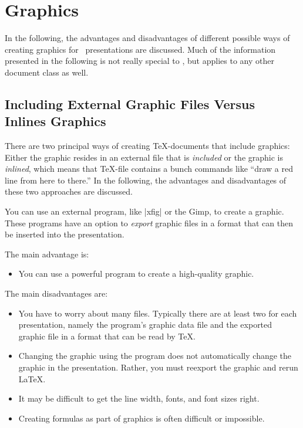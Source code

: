 

%

\section{Graphics}


\label{section-graphics}

In the following, the advantages and disadvantages of different
possible ways of creating graphics for \beamer\ presentations are
discussed. Much of the information presented in the following is not
really special to \beamer, but applies to any other document class as well.


\subsection{Including External Graphic Files Versus Inlines Graphics}

There are two principal ways of creating \TeX-documents that include
graphics: Either the graphic resides in an external file that is
\emph{included} or the graphic is \emph{inlined}, which means that
\TeX-file contains a bunch commands like ``draw a red line from
here to there.'' In the following, the advantages and disadvantages of
these two approaches are discussed.

You can use an external program, like |xfig| or the Gimp, to create a
graphic. These programs have an option to \emph{export} graphic files
in a format that can then be inserted into the presentation.

The main advantage is:
\begin{itemize}
\item
  You can use a powerful program to create a high-quality graphic.
\end{itemize}

The main disadvantages are:
\begin{itemize}
\item
  You  have to worry about many files. Typically there are at least
  two for each presentation, namely the program's graphic data file and the
  exported graphic file in a format that can be read by \TeX.
\item
  Changing the graphic using the program does not automatically change
  the graphic in the presentation. Rather, you must reexport the
  graphic and rerun \LaTeX.
\item
  It may be difficult to get the line width, fonts, and font sizes
  right.
\item
  Creating formulas as part of graphics is often difficult or
  impossible.
\end{itemize}

